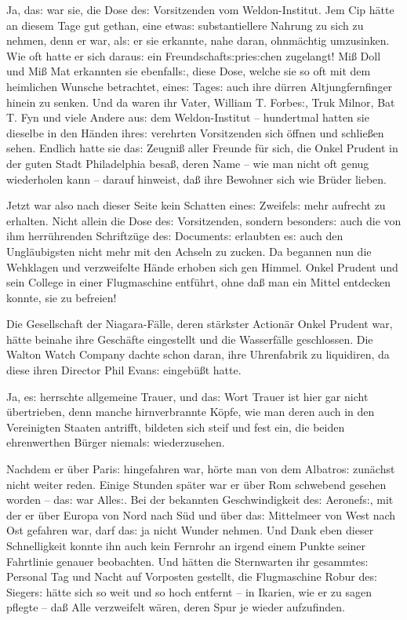 \documentclass[oneside,12pt]{book}
\newenvironment{antiqua}{\normalfont}{}
\newcommand{\s}{s:}
\begin{document}
Ja, da{\s} war sie, die Dose de{\s} Vorsitzenden vom Weldon-Institut.
Jem Cip h\"atte an diesem Tage gut gethan, eine etwa{\s}
substantiellere Nahrung zu sich zu nehmen, denn er war, al{\s} er sie
erkannte, nahe daran, ohnm\"achtig umzusinken. Wie oft hatte er sich
darau{\s} ein Freundschaft{\s}prie{\s}chen zugelangt! Mi{\ss} Doll
und Mi{\ss} Mat erkannten sie ebenfall{\s}, diese Dose, welche sie so
oft mit dem heimlichen Wunsche betrachtet, eine{\s} Tage{\s} auch
ihre d\"urren Altjungfernfinger hinein zu senken. Und da waren ihr
Vater, William T. Forbe{\s}, Truk Milnor, Bat T. Fyn und viele Andere
au{\s} dem Weldon-Institut -- hundertmal hatten sie dieselbe in den
H\"anden ihre{\s} verehrten Vorsitzenden sich \"offnen und
schlie{\ss}en sehen. Endlich hatte sie da{\s} Zeugni{\ss} aller
Freunde f\"ur sich, die Onkel Prudent in der guten Stadt Philadelphia
besa{\ss}, deren Name -- wie man nicht oft genug wiederholen kann --
darauf hinweist, da{\ss} ihre Bewohner sich wie Br\"uder lieben.

Jetzt war also nach dieser Seite kein Schatten eine{\s} Zweifel{\s}
mehr aufrecht zu erhalten. Nicht allein die Dose de{\s} Vorsitzenden,
sondern besonder{\s} auch die von ihm herr\"uhrenden Schrift\/z\"uge
de{\s} Document{\s} erlaubten e{\s} auch den Ungl\"aubigsten nicht
mehr mit den Achseln zu zucken. Da begannen nun die Wehklagen und
verzweifelte H\"ande erhoben sich gen Himmel. Onkel Prudent und sein
College in einer Flugmaschine entf\"uhrt, ohne da{\ss} man ein Mittel
entdecken konnte, sie zu befreien!

Die Gesellschaft der Niagara-F\"alle, deren st\"arkster Action\"ar
Onkel Prudent war, h\"atte beinahe ihre Gesch\"afte eingestellt und
die Wasserf\"alle geschlossen. Die \begin{antiqua}Walton Watch
Company\end{antiqua} dachte schon daran, ihre Uhrenfabrik zu
liquidiren, da diese ihren Director Phil Evan{\s} eingeb\"u{\ss}t
hatte.

Ja, e{\s} herrschte allgemeine Trauer, und da{\s} Wort Trauer ist
hier gar nicht \"ubertrieben, denn manche hirnverbrannte K\"opfe, wie
man deren auch in den Vereinigten Staaten antrifft, bildeten sich
steif und fest ein, die beiden ehrenwerthen B\"urger niemal{\s}
wiederzusehen.

Nachdem er \"uber Pari{\s} hingefahren war, h\"orte man von dem
{\glqq}Albatro{\s}{\grqq} zun\"achst nicht weiter reden. Einige
Stunden sp\"ater war er \"uber Rom schwebend gesehen worden -- da{\s}
war Alle{\s}. Bei der bekannten Geschwindigkeit de{\s} Aeronef{\s},
mit der er \"uber Europa von Nord nach S\"ud und \"uber da{\s}
Mittelmeer von West nach Ost gefahren war, darf da{\s} ja nicht
Wunder nehmen. Und Dank eben dieser Schnelligkeit konnte ihn auch
kein Fernrohr an irgend einem Punkte seiner Fahrtlinie genauer
beobachten. Und h\"atten die Sternwarten ihr gesammte{\s} Personal
Tag und Nacht auf Vorposten gestellt, die Flugmaschine Robur de{\s}
Sieger{\s} h\"atte sich so weit und so hoch entfernt -- in
{\glqq}Ikarien{\grqq}, wie er zu sagen pflegte -- da{\ss} Alle
verzweifelt w\"aren, deren Spur je wieder aufzufinden.
\end{document}
